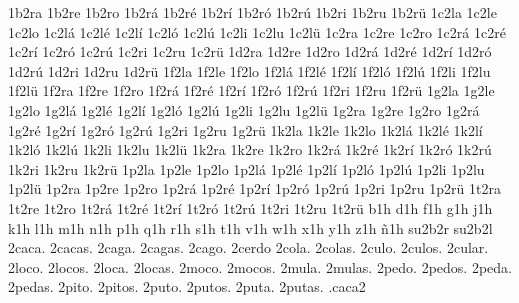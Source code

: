 {1b2ra 1b2re 1b2ro 1b2r^^e1 1b2r^^e9 1b2r^^ed 1b2r^^f3 1b2r^^fa 1b2ri 1b2ru 1b2r^^fc 
1c2la 1c2le 1c2lo 1c2l^^e1 1c2l^^e9 1c2l^^ed 1c2l^^f3 1c2l^^fa 1c2li 1c2lu 1c2l^^fc 
1c2ra 1c2re 1c2ro 1c2r^^e1 1c2r^^e9 1c2r^^ed 1c2r^^f3 1c2r^^fa 1c2ri 1c2ru 1c2r^^fc 
1d2ra 1d2re 1d2ro 1d2r^^e1 1d2r^^e9 1d2r^^ed 1d2r^^f3 1d2r^^fa 1d2ri 1d2ru 1d2r^^fc 
1f2la 1f2le 1f2lo 1f2l^^e1 1f2l^^e9 1f2l^^ed 1f2l^^f3 1f2l^^fa 1f2li 1f2lu 1f2l^^fc 
1f2ra 1f2re 1f2ro 1f2r^^e1 1f2r^^e9 1f2r^^ed 1f2r^^f3 1f2r^^fa 1f2ri 1f2ru 1f2r^^fc 
1g2la 1g2le 1g2lo 1g2l^^e1 1g2l^^e9 1g2l^^ed 1g2l^^f3 1g2l^^fa 1g2li 1g2lu 1g2l^^fc 
1g2ra 1g2re 1g2ro 1g2r^^e1 1g2r^^e9 1g2r^^ed 1g2r^^f3 1g2r^^fa 1g2ri 1g2ru 1g2r^^fc 
1k2la 1k2le 1k2lo 1k2l^^e1 1k2l^^e9 1k2l^^ed 1k2l^^f3 1k2l^^fa 1k2li 1k2lu 1k2l^^fc 
1k2ra 1k2re 1k2ro 1k2r^^e1 1k2r^^e9 1k2r^^ed 1k2r^^f3 1k2r^^fa 1k2ri 1k2ru 1k2r^^fc 
1p2la 1p2le 1p2lo 1p2l^^e1 1p2l^^e9 1p2l^^ed 1p2l^^f3 1p2l^^fa 1p2li 1p2lu 1p2l^^fc 
1p2ra 1p2re 1p2ro 1p2r^^e1 1p2r^^e9 1p2r^^ed 1p2r^^f3 1p2r^^fa 1p2ri 1p2ru 1p2r^^fc 
1t2ra 1t2re 1t2ro 1t2r^^e1 1t2r^^e9 1t2r^^ed 1t2r^^f3 1t2r^^fa 1t2ri 1t2ru 1t2r^^fc 
b1h d1h f1h g1h j1h k1h l1h m1h n1h p1h q1h r1h s1h t1h v1h w1h x1h y1h z1h ^^f11h 
su2b2r su2b2l
2caca. 2cacas.
2caga. 2cagas.
2cago. 2cerdo
2cola. 2colas.
2culo. 2culos.
2cular.
2loco. 2locos. 2loca. 2locas.
2moco. 2mocos.
2mula. 2mulas.
2pedo. 2pedos. 2peda. 2pedas.
2pito. 2pitos.
2puto. 2putos. 2puta. 2putas.
.caca2
}
\endgroup
